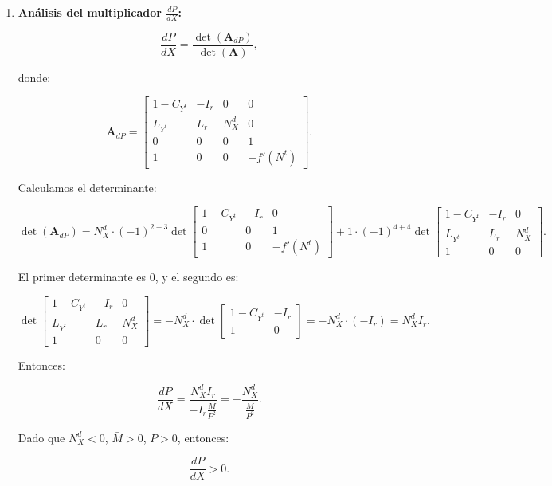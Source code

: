 \documentclass[
  doc,
  floatsintext,
  longtable,
  a4paper,
  nolmodern,
  notxfonts,
  notimes,
  12pt,
  colorlinks=true,linkcolor=blue,citecolor=blue,urlcolor=blue]{apa7}
\begin{document}
\begin{enumerate}
  Entonces:

  \[
  \det(\mathbf{A}_{dY^t}) = -f'(N^t) \cdot N^d_X \cdot (-I_r) \cdot \frac{\bar{M}}{P^2} = f'(N^t) N^d_X I_r \frac{\bar{M}}{P^2}.
  \]

  Por lo tanto:

  \[
  \frac{dY^t}{dX} = \frac{f'(N^t) N^d_X I_r \frac{\bar{M}}{P^2}}{-I_r \frac{\bar{M}}{P^2}} = f'(N^t) N^d_X.
  \]

  Dado que \(f'(N^t) > 0\) y \(N^d_X < 0\), entonces:

  \[
  \frac{dY^t}{dX} < 0.
  \]
\item
  \textbf{Análisis del multiplicador \(\frac{dP}{dX}\):}

  \[
  \frac{dP}{dX} = \frac{\det(\mathbf{A}_{dP})}{\det(\mathbf{A})},
  \]

  donde:

  \[
  \mathbf{A}_{dP} = \begin{bmatrix}
  1 - C_{Y^t} & -I_r & 0 & 0 \\
  L_{Y^t} & L_r & N^d_X & 0 \\
  0 & 0 & 0 & 1 \\
  1 & 0 & 0 & -f'(N^t)
  \end{bmatrix}.
  \]

  Calculamos el determinante:

  \[
  \det(\mathbf{A}_{dP}) = N^d_X \cdot (-1)^{2+3} \det \begin{bmatrix}
  1 - C_{Y^t} & -I_r & 0 \\
  0 & 0 & 1 \\
  1 & 0 & -f'(N^t)
  \end{bmatrix} + 1 \cdot (-1)^{4+4} \det \begin{bmatrix}
  1 - C_{Y^t} & -I_r & 0 \\
  L_{Y^t} & L_r & N^d_X \\
  1 & 0 & 0
  \end{bmatrix}.
  \]

  El primer determinante es 0, y el segundo es:

  \[
  \det \begin{bmatrix}
  1 - C_{Y^t} & -I_r & 0 \\
  L_{Y^t} & L_r & N^d_X \\
  1 & 0 & 0
  \end{bmatrix} = -N^d_X \cdot \det \begin{bmatrix}
  1 - C_{Y^t} & -I_r \\
  1 & 0
  \end{bmatrix} = -N^d_X \cdot (-I_r) = N^d_X I_r.
  \]

  Entonces:

  \[
  \frac{dP}{dX} = \frac{N^d_X I_r}{-I_r \frac{\bar{M}}{P^2}} = -\frac{N^d_X}{\frac{\bar{M}}{P^2}}.
  \]

  Dado que \(N^d_X < 0\), \(\bar{M} > 0\), \(P > 0\), entonces:

  \[
  \frac{dP}{dX} > 0.
  \]
\end{enumerate}
\end{document}
